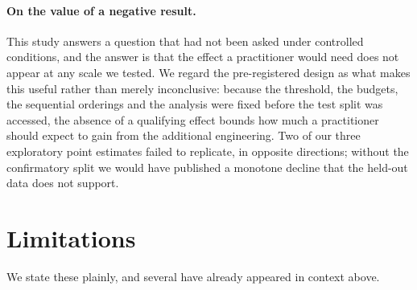 \paragraph{On the value of a negative result.} This study answers a question that had not
been asked under controlled conditions, and the answer is that the effect a practitioner
would need does not appear at any scale we tested. We regard the pre-registered design as
what makes this useful rather than merely inconclusive: because the threshold, the budgets,
the sequential orderings and the analysis were fixed before the test split was accessed, the
absence of a qualifying effect bounds how much a practitioner should expect to gain from the
additional engineering. Two of our three exploratory point estimates failed to replicate, in
opposite directions; without the confirmatory split we would have published a monotone
decline that the held-out data does not support.

\section{Limitations}
\label{subsec:limits}

We state these plainly, and several have already appeared in context above.

